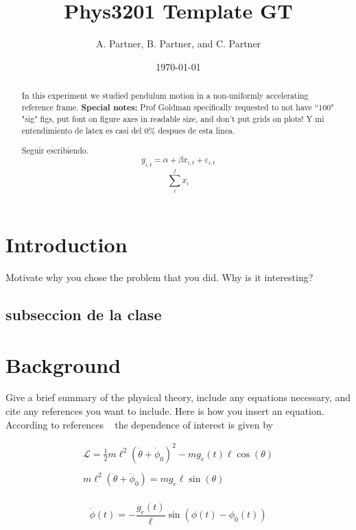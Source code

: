 \documentclass[letterpaper,12pt]{article}
\begin{document}
\date{\today}
\title{Phys3201 Template GT}
\author{A. Partner, B. Partner, and C. Partner}


\maketitle

\begin{abstract}
In this experiment we studied pendulum motion in a non-uniformly 
accelerating reference frame. \textbf{Special notes:} Prof Goldman 
specifically requested to not have ``100" "sig" figs, put font on 
figure axes in readable size, and don't put grids on plots! Y mi
entendimiento de latex es casi del 0\% despues de esta linea.

Seguir escribiendo. $$y_{i,t}= \alpha + \beta x_{i,t} + \varepsilon_{i,t}$$
$$\sum_i^j x_i$$
\end{abstract}


\section{Introduction}

Motivate why you chose the problem that you did. Why is it interesting? 

\subsection{subseccion de la clase}

\blindtext %


\section{Background}

Give a brief summary of the physical theory, include any equations necessary, and cite any references you want to include. Here is how you insert an equation. According to references ~\cite{melissinos, Cyr, Wiki} the dependence of interest is given
by


\begin{gather*}
   \mathcal{L} =  \frac{1}{2} m \ell^2 ( \dot{\theta}+\dot{\phi}_0)^2 - m g_e(t) \ell \cos(\theta)\\
   \\
   m\ell^2 (\ddot{\theta} + \ddot{\phi}_0) = mg_e\ell\sin(\theta)\\
\end{gather*}


\begin{equation}
   \dot{\phi}(t) = -\frac{g_e(t)}{\ell} \sin\left(\phi(t)-\phi_0(t)\right)
   \label{Eq:equation1} %
\end{equation}
\end{document}
